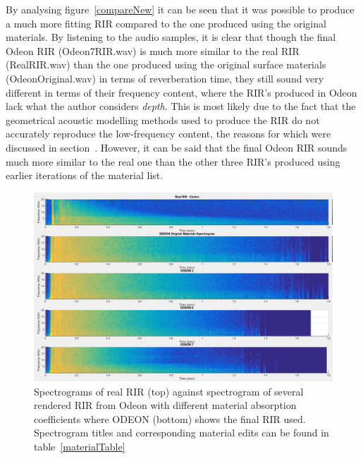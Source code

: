 \documentclass[../../main.tex]{subfiles}
\begin{document}
			By analysing figure~\ref{compareNew} it can be seen that it was possible to produce a much more fitting \ac{RIR} compared to the one produced using the original materials. By listening to the audio samples, it is clear that though the final Odeon RIR (Odeon7RIR.wav) is much more similar to the real \ac{RIR} (RealRIR.wav) than the one produced using the original surface materials (OdeonOriginal.wav) in terms of reverberation time, they still sound very different in terms of their frequency content, where the \ac{RIR}'s produced in Odeon lack what the author considers \textit{depth}. This is most likely due to the fact that the geometrical acoustic modelling methods used to produce the \ac{RIR} do not accurately reproduce the low-frequency content, the reasons for which were discussed in section~. However, it can be said that the final Odeon \ac{RIR} sounds much more similar to the real one than the other three \ac{RIR}'s produced using earlier iterations of the material list.

			\begin{figure}[H]
				\centerline{\includegraphics[scale = 0.45]{Sections/Implementation/Odeon/images/MaterialCompare/OriginalMaterials/all.png}}
				\caption{Spectrograms of real \ac{RIR} (top) against spectrogram of several rendered \ac{RIR} from Odeon with different material absorption coefficients where ODEON (bottom) shows the final \ac{RIR} used. Spectrogram titles and corresponding material edits can be found in table~\ref{materialTable}}
				\label{compareAll}
			\end{figure}
\end{document}
